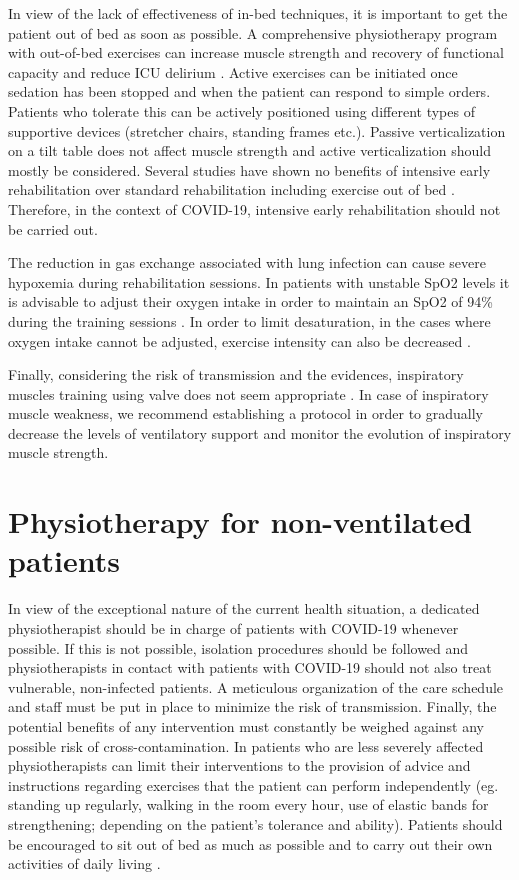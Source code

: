 In view of the lack of effectiveness of in-bed techniques, it is important to get the patient out of bed as soon as possible. A comprehensive physiotherapy program with out-of-bed exercises can increase muscle strength and recovery of functional capacity and reduce ICU delirium \cite{schweickert_early_2009}. Active exercises can be initiated once sedation has been stopped and when the patient can respond to simple orders. Patients who tolerate this can be actively positioned using different types of supportive devices (stretcher chairs, standing frames etc.). Passive verticalization on a tilt table does not affect muscle strength \cite{sarfati_efficacy_2018} and active verticalization should mostly be considered. Several studies have shown no benefits of intensive early rehabilitation  over standard rehabilitation including exercise out of bed \cite{moss_randomized_2016,wright_intensive_2018}. Therefore, in the context of COVID-19, intensive early rehabilitation should not be carried out.

The reduction in gas exchange associated with lung infection can cause severe hypoxemia during rehabilitation sessions. In patients with unstable SpO2 levels it is advisable to adjust their oxygen intake in order to maintain an SpO2 of 94\% during the training sessions \cite{thomas_physiotherapy_2020}. In order to limit desaturation, in the cases where oxygen intake cannot be adjusted, exercise intensity can also be decreased \cite{hillegass2014supplemental}.

Finally, considering the risk of transmission and the evidences, inspiratory muscles training using valve does not seem appropriate \cite{vorona_inspiratory_2018,elkins_inspiratory_2015}. In case of inspiratory muscle weakness, we recommend establishing a protocol in order to gradually decrease the levels of ventilatory support and monitor the evolution of inspiratory muscle strength.

\section{Physiotherapy for non-ventilated patients}
In view of the exceptional nature of the current health situation, a dedicated physiotherapist should be in charge of patients with COVID-19 whenever possible. If this is not possible, isolation procedures should be followed and physiotherapists in contact with patients with COVID-19 should not also treat vulnerable, non-infected patients. A meticulous organization of the care schedule and staff must be put in place to minimize the risk of transmission. Finally, the potential benefits of any intervention must constantly be weighed against any possible risk of cross-contamination. In patients who are less severely affected physiotherapists can limit their interventions to the provision of advice and instructions regarding exercises that the patient can perform independently (eg. standing up regularly, walking in the room every hour, use of elastic bands for strengthening; depending on the patient's tolerance and ability). Patients should be encouraged to sit out of bed as much as possible and to carry out their own activities of daily living \cite{thomas_physiotherapy_2020}.

